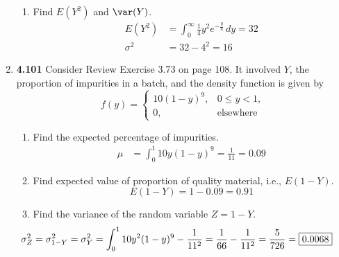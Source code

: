 \documentclass[basic, header]{nosvagor-notes}
\begin{document}
\begin{enumerate}[leftmargin=1.5em, itemsep=2em]
\begin{enumerate}[leftmargin=1.6em]
      \item Find \(E(Y^2)\) and \(\var(Y)\).
        \begin{align*}
          E(Y^2) &= \int_{0}^{\infty} \frac{1}{4}y^2e^{-\frac{y}{4}}\, dy = \boxed{32} \\
          \sigma^2 &= 32 - 4^2 = \boxed{16}
        \end{align*}

    \end{enumerate}

    \vspace{-2em}

  \item \textbf{4.101} Consider Review Exercise 3.73 on page 108. It
    involved \(Y\), the proportion of impurities in a batch, and the density
    function is given by
    \[%
      f(y) =
      \begin{cases}
        10(1-y)^9,			& 0 \leq y < 1, \\
        0, & \text{elsewhere}
      \end{cases}
    \]%
    \begin{enumerate}[leftmargin=1.6em]

      \item Find the expected percentage of impurities.
        \begin{align*}
          \mu &= \int_{0}^{1} 10y(1-y)^9 = \frac{1}{11} = \boxed{0.09}
        \end{align*}

      \item Find expected value of proportion of quality material, i.e.,
        \(E(1-Y)\).
      \[%
        E(1-Y) = 1 - 0.09 = \boxed{0.91}
      \]%

      \item Find the variance of the random variable \(Z = 1-Y\).
        \[%
        \hspace{-3em}
          \sigma^2_Z = \sigma^2_{1-Y} = \sigma^2_Y
          = \int_{0}^{1} 10y^2(1-y)^9 - \frac{1}{11^2}
          = \frac{1}{66} - \frac{1}{11^2} = \frac{5}{726}= \boxed{0.0068}
        \]%

    \end{enumerate}


\end{enumerate}
\end{document}
